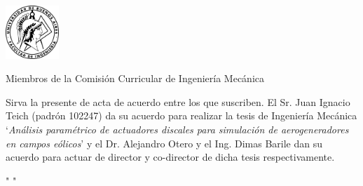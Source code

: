 \documentclass{letter}
\begin{document}
\begin{letter}{\includegraphics[width=0.15\textwidth]{Logo-fiuba.png}\hfill}
\opening{Miembros de la Comisión Curricular de Ingeniería Mecánica}
Sirva la presente de acta de acuerdo entre los que suscriben. El Sr. Juan Ignacio Teich (padrón 102247) da su acuerdo para realizar la tesis de Ingeniería Mecánica `\textit{Análisis paramétrico de actuadores discales para simulación de aerogeneradores en campos eólicos}' y el Dr. Alejandro Otero y el Ing. Dimas Barile dan su acuerdo para actuar de director y co-director de dicha tesis respectivamente.
\closing{" "}
\end{letter}
\end{document}
